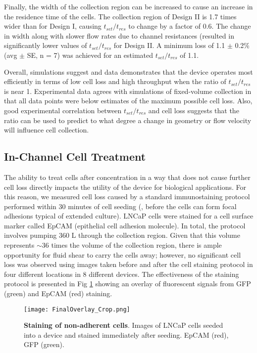 Finally, the width of the collection region can be increased to cause an increase in the residence time of the cells. The collection region of Design II is 1.7 times wider than for Design I, causing $t_{set}/t_{res}$ to change by a factor of 0.6. The change in width along with slower flow rates due to channel resistances  (resulted in significantly lower values of $t_{set}/t_{res}$ for Design II. A minimum loss of 1.1 $\pm$ 0.2\% (avg $\pm$ SE, n = 7) was achieved for an estimated $t_{set}/t_{res}$ of 1.1.

Overall, simulations suggest and data demonstrates that the device operates most efficiently in terms of low cell loss and high throughput when the ratio of $t_{set}/t_{res}$ is near 1. Experimental data agrees with simulations of fixed-volume collection in that all data points were below estimates of the maximum possible cell loss. Also, good experimental correlation between $t_{set}/t_{res}$ and cell loss suggests that the ratio can be used to predict to what degree a change in geometry or flow velocity will influence cell collection.

\subsection{In-Channel Cell Treatment}

The ability to treat cells after concentration in a way that does not cause further cell loss directly impacts the utility of the device for biological applications. For this reason, we measured cell loss caused by a standard immunostaining protocol performed within 30 minutes of cell seeding (\ie , before the cells can form focal adhesions typical of extended culture). LNCaP cells were stained for a cell surface marker called EpCAM (epithelial cell adhesion molecule). In total, the protocol involves pumping 360 \textmu L through the collection region. Given that this volume represents $\sim$36 times the volume of the collection region, there is ample opportunity for fluid shear to carry the cells away; however, no significant cell loss was observed using images taken before and after the cell staining protocol in four different locations in 8 different devices. The effectiveness of the staining protocol is presented in Fig \ref{fig:staining} showing an overlay of fluorescent signals from GFP (green) and EpCAM (red) staining.
\begin{figure}[t]
\centering
\texttt{[image: FinalOverlay\_Crop.png]}
\caption{\textbf{Staining of non-adherent cells}. Images of LNCaP cells seeded into a device and stained immediately after seeding. EpCAM (red), GFP (green).}
\label{fig:staining}
\end{figure}

